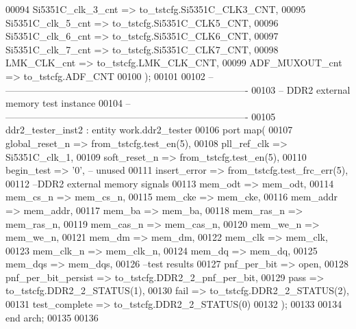 \begin{DoxyCode}
00094       Si5351C_clk_3_cnt => to\_tstcfg.Si5351C\_CLK3\_CNT,
00095       Si5351C_clk_5_cnt => to\_tstcfg.Si5351C\_CLK5\_CNT,
00096       Si5351C_clk_6_cnt => to\_tstcfg.Si5351C\_CLK6\_CNT,
00097       Si5351C_clk_7_cnt => to\_tstcfg.Si5351C\_CLK7\_CNT,
00098       LMK_CLK_cnt       => to\_tstcfg.LMK\_CLK\_CNT,
00099       ADF_MUXOUT_cnt    => to\_tstcfg.ADF\_CNT
00100    \textcolor{vhdlchar}{)};
00101    
00102 \textcolor{keyword}{-- ----------------------------------------------------------------------------}
00103 \textcolor{keyword}{-- DDR2 external memory test instance}
00104 \textcolor{keyword}{-- ----------------------------------------------------------------------------   }
00105    ddr2\_tester\_inst2 : \textcolor{keywordflow}{entity} work.ddr2_tester
00106    \textcolor{keywordflow}{port} \textcolor{keywordflow}{map}(
00107         global_reset_n          => from\_tstcfg.test\_en\textcolor{vhdlchar}{(}\textcolor{vhdllogic}{5}\textcolor{vhdlchar}{)},
00108         pll_ref_clk             => Si5351C_clk_1,
00109         soft_reset_n            => from\_tstcfg.test\_en\textcolor{vhdlchar}{(}\textcolor{vhdllogic}{5}\textcolor{vhdlchar}{)},
00110         begin_test              => '0',\textcolor{keyword}{ -- unused}
00111         insert_error            => from\_tstcfg.test\_frc\_err\textcolor{vhdlchar}{(}\textcolor{vhdllogic}{5}\textcolor{vhdlchar}{)},
00112 \textcolor{keyword}{      --DDR2 external memory signals    }
00113         mem_odt                 => mem_odt,
00114         mem_cs_n                    => mem_cs_n,
00115         mem_cke                 => mem_cke,
00116         mem_addr                    => mem_addr,
00117         mem_ba                  => mem_ba,
00118         mem_ras_n               => mem_ras_n,
00119         mem_cas_n               => mem_cas_n,
00120         mem_we_n                    => mem_we_n,
00121         mem_dm                  => mem_dm,
00122         mem_clk                 => mem_clk,
00123         mem_clk_n               => mem_clk_n,
00124         mem_dq                  => mem_dq,
00125         mem_dqs                 => mem_dqs, 
00126 \textcolor{keyword}{        --test results}
00127         pnf_per_bit             => \textcolor{keywordflow}{open},
00128         pnf_per_bit_persist     => to\_tstcfg.DDR2\_2\_pnf\_per\_bit,
00129       pass                  => to\_tstcfg.DDR2\_2\_STATUS\textcolor{vhdlchar}{(}\textcolor{vhdllogic}{1}\textcolor{vhdlchar}{)},
00130         fail                    => to\_tstcfg.DDR2\_2\_STATUS\textcolor{vhdlchar}{(}\textcolor{vhdllogic}{2}\textcolor{vhdlchar}{)},
00131         test_complete           => to\_tstcfg.DDR2\_2\_STATUS\textcolor{vhdlchar}{(}\textcolor{vhdllogic}{0}\textcolor{vhdlchar}{)}
00132    \textcolor{vhdlchar}{)};
00133   
00134 \textcolor{keywordflow}{end} \textcolor{vhdlchar}{arch};   
00135 
00136 
\end{DoxyCode}
